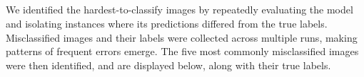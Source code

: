 \documentclass[final,3p,times,12pt]{article}
\begin{document}
\subsection{}

We identified the hardest-to-classify images by repeatedly evaluating the model and isolating instances where its predictions differed from the true labels. Misclassified images and their labels were collected across multiple runs, making patterns of frequent errors emerge. The five most commonly misclassified images were then identified, and are displayed below, along with their true labels. 

\begin{figure}[H] %
    \centering
\end{figure}
\end{document}
